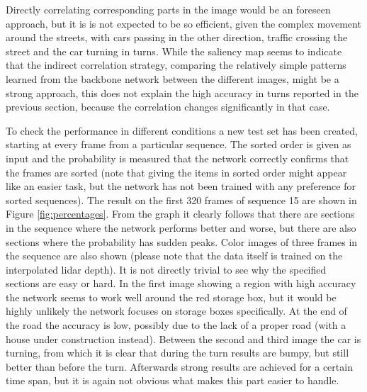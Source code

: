 Directly correlating corresponding parts in the image would be an foreseen approach, but it is is not expected to be so efficient, given the complex movement around the streets, with cars passing in the other direction, traffic crossing the street and the car turning in turns. While the saliency map seems to indicate that the indirect correlation strategy, comparing the relatively simple patterns learned from the backbone network between the different images, might be a strong approach, this does not explain the high accuracy in turns reported in the previous section, because the correlation changes significantly in that case. 


To check the performance in different conditions a new test set has been created, starting at every frame from a particular sequence. The sorted order is given as input and the probability is measured that the network correctly confirms that the frames are sorted (note that giving the items in sorted order might appear like an easier task, but the network has not been trained with any preference for sorted sequences). The result on the first 320 frames of sequence 15 are shown in Figure \ref{fig:percentages}. From the graph it clearly follows that there are sections in the sequence where the network performs better and worse, but there are also sections where the probability has sudden peaks. Color images of three frames in the sequence are also shown (please note that the data itself is trained on the interpolated lidar depth). It is not directly trivial to see why the specified sections are easy or hard. In the first image showing a region with high accuracy the network seems to work well around the red storage box, but it would be highly unlikely the network focuses on storage boxes specifically. At the end of the road the accuracy is low, possibly due to the lack of a proper road (with a house under construction instead). Between the second and third image the car is turning, from which it is clear that during the turn results are bumpy, but still better than before the turn. Afterwards strong results are achieved for a certain time span, but it is again not obvious what makes this part easier to handle. 

